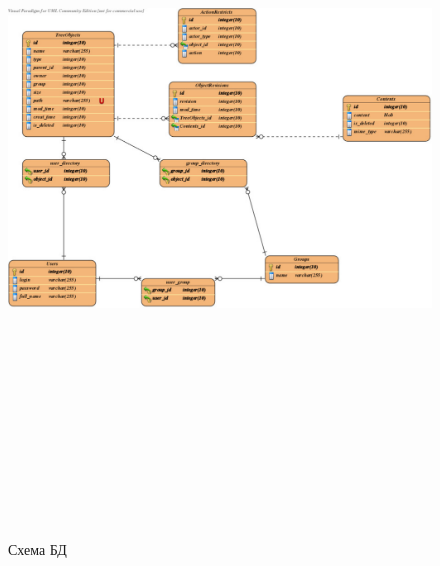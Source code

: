 \documentclass[utf8,usehyperref,12pt]{G7-32}
\begin{document}
\begin{figure}[h]
   \centering%
   \includegraphics[height=200mm, width=1\textwidth, angle=90, clip, keepaspectratio]{pictures/DB}
   \caption{Схема БД}\label{fig:appendix_db_scheme}
 \end{figure}
\end{document}
